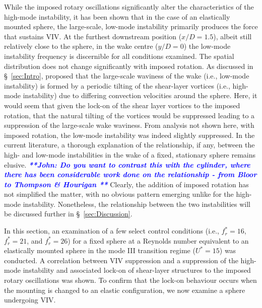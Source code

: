 \documentclass[3p]{elsarticle}
\newcommand{\Ustar}{\ensuremath{U^{*}}}
\newcommand{\freqrat}{\ensuremath{f_r^*}}
\newcommand{\js}[1]{{\textcolor{blue}{{\bf{\it{ **John: #1 **}}}}}}
\begin{document}
While the imposed rotary oscillations significantly alter
the characteristics of the high-mode instability, it has been shown
that in the case of an elastically mounted sphere, the large-scale,
low-mode instability primarily produces the force that
sustains VIV. At the furthest downstream position ($x/D=1.5$), albeit still
relatively close to the sphere, in the wake centre ($y/D=0$) the
low-mode instability frequency is discernible for all conditions
examined. The spatial distribution does not change significantly with imposed
rotation. As discussed in \S~\ref{sec:Intro}, \citet{Yun2006} proposed that the large-scale
waviness of the wake (i.e., low-mode instability) is formed by a
periodic tilting of the shear-layer vortices (i.e., high-mode
instability) due to differing convection velocities around the sphere.
Here, it would seem that given the lock-on of the shear layer
vortices to the imposed rotation, that the natural tilting of the
vortices would be suppressed leading to a suppression of the large-scale wake
waviness. From analysis not shown here, with imposed rotation, the low-mode instability was indeed slightly suppressed. In the current literature, a thorough explanation of the relationship, if any, between the high- and low-mode instabilities in the wake of a fixed, stationary sphere remains elusive. \js{Do you want to contrast this with the cylinder, where there has been considerable work done on the relationship - from Bloor to Thompson \& Hourigan} Clearly, the addition of imposed rotation has not simplified the matter, with no obvious pattern emerging unlike for the high-mode instability. Nonetheless, the relationship between the two instabilities will be discussed further in \S~\ref{sec:Discussion}.
%

In this section, an examination of a few select control conditions (i.e., $\freqrat=16$, $\freqrat=21$, and $\freqrat=26$) for a fixed sphere
at a Reynolds number equivalent to an elastically mounted sphere in
the mode III transition regime ($\Ustar=15$) was conducted. A correlation between
VIV suppression and a suppression of the high-mode instability and associated lock-on of shear-layer structures to the
imposed rotary oscillations was shown. To confirm that the lock-on
behaviour occurs when the mounting is changed to an elastic configuration, we now examine a sphere undergoing VIV.
\end{document}
